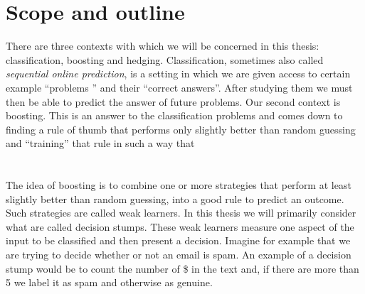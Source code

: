 \section{Scope and outline}
There are three contexts with which we will be concerned in this thesis: classification, boosting and hedging.
Classification, sometimes also called \textit{sequential online prediction}, is a setting in which we are given access to certain example ``problems '' and their ``correct answers''. After studying them we must then be able to predict the answer of future problems. Our second context is boosting. This is an answer to the classification problems and comes down to finding a rule of thumb that performs only slightly better than random guessing and ``training''  that rule in such a way that 

\section{\weak}
The idea of boosting is to combine one or more strategies that perform at least slightly better than random guessing, into a good rule to predict an outcome. Such strategies are called weak learners. In this thesis we will primarily consider what are called decision stumps. These weak learners measure one aspect of the input to be classified and then present a decision. Imagine for example that we are trying to decide whether or not an email is spam. An example of a decision stump would be to count the number of \$ in the text and, if there are more than 5 we label it as spam and otherwise as genuine. 

